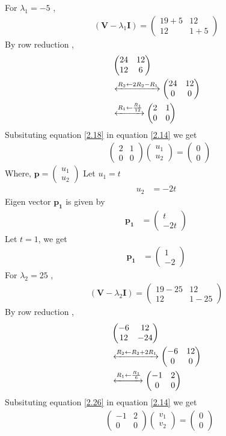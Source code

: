 \documentclass[journal,12pt,twocolumn]{IEEEtran}
\let\vec\mathbf
\numberwithin{equation}{subsection}
\newcommand{\myvec}[1]{\ensuremath{\begin{pmatrix}#1\end{pmatrix}}}
\begin{document}
For $\lambda_1=-5$ ,
\begin{align}
    (\vec{V}-\lambda_1\vec{I})=\myvec{19+5 & 12 \\12 & 1+5}
\end{align}
By row reduction , 
\begin{align}
    &\myvec{24 & 12 \\12 & 6}\\
&\xleftrightarrow{R_2\leftarrow 2R_2 -R_1}
    \myvec{24 & 12 \\ 0& 0}\\
        &\xleftrightarrow{R_1\leftarrow \frac{R_1}{12}}
    \myvec{2 & 1 \\ 0& 0}
    \label{2.18}
\end{align}
Subsituting equation \ref{2.18} in equation \ref{2.14} we get
\begin{align}
        &   \myvec{2 & 1 \\ 0& 0}\myvec{u_1 \\ u_2}=\myvec{0 \\ 0}\label{2.19}
\end{align}
Where, $\vec{p}=\myvec{u_1\\u_2}$
Let $u_1=t$
\begin{align}
    u_2&=-2t
\end{align}
Eigen vector $\vec{p_1}$ is given by
\begin{align}
    \vec{p_1}&=\myvec{t \\ -2t}
\end{align}
Let $t=1$, we get
\begin{align}
        \vec{p_1}&=\myvec{1 \\-2 }\label{2.22}
\end{align}
For $\lambda_2=25$ ,
\begin{align}
    (\vec{V}-\lambda_2\vec{I})=\myvec{19-25 & 12 \\12 & 1-25}
\end{align}
By row reduction , 
\begin{align}
    &\myvec{-6 & 12 \\12 & -24}\\
&\xleftrightarrow{R_2\leftarrow R_2 +2R_1}
    \myvec{-6 & 12 \\ 0& 0}\\
        &\xleftrightarrow{R_1\leftarrow \frac{R_1}{6}}
    \myvec{-1 & 2 \\ 0& 0}
    \label{2.26}
\end{align}
Subsituting equation \ref{2.26} in equation \ref{2.14} we get
\begin{align}
        &   \myvec{-1 & 2 \\ 0& 0}\myvec{v_1 \\ v_2}=\myvec{0 \\ 0}\label{2.27}
\end{align}
\end{document}
